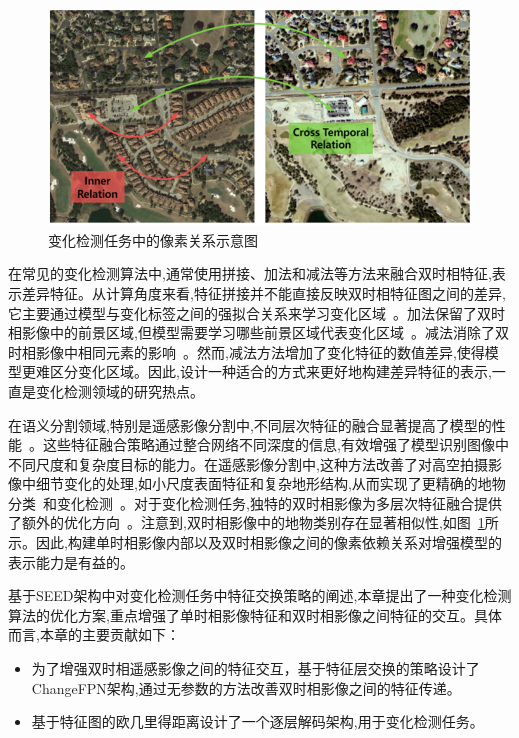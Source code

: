 \begin{figure}[!htbp]
  \centering
  \includegraphics[width=\textwidth]{paper_figures/基于双时相遥感影像特征交互的变化检测算法研究/EfficientCD/efficientcd_relation.png}
  \caption{变化检测任务中的像素关系示意图}
  \label{fig:efficientcd_relation}
\end{figure}

在常见的变化检测算法中,通常使用拼接、加法和减法等方法来融合双时相特征,表示差异特征。从计算角度来看,特征拼接并不能直接反映双时相特征图之间的差异,它主要通过模型与变化标签之间的强拟合关系来学习变化区域~\cite{Daudt2018FullyCS}。加法保留了双时相影像中的前景区域,但模型需要学习哪些前景区域代表变化区域~\cite{gu2023fdff}。减法消除了双时相影像中相同元素的影响~\cite{feng_change_2023}。然而,减法方法增加了变化特征的数值差异,使得模型更难区分变化区域。因此,设计一种适合的方式来更好地构建差异特征的表示,一直是变化检测领域的研究热点。

在语义分割领域,特别是遥感影像分割中,不同层次特征的融合显著提高了模型的性能~\cite{Dong2021AMF, lin_feature_2017}。这些特征融合策略通过整合网络不同深度的信息,有效增强了模型识别图像中不同尺度和复杂度目标的能力。在遥感影像分割中,这种方法改善了对高空拍摄影像中细节变化的处理,如小尺度表面特征和复杂地形结构,从而实现了更精确的地物分类~\cite{wang2022unetformer}和变化检测~\cite{dong_changeclip_2024}。对于变化检测任务,独特的双时相影像为多层次特征融合提供了额外的优化方向~\cite{dong_changeclip_2024, Li2023MDFENetAM}。注意到,双时相影像中的地物类别存在显著相似性,如图~\ref{fig:efficientcd_relation}所示。因此,构建单时相影像内部以及双时相影像之间的像素依赖关系对增强模型的表示能力是有益的。

基于SEED架构中对变化检测任务中特征交换策略的阐述,本章提出了一种变化检测算法的优化方案,重点增强了单时相影像特征和双时相影像之间特征的交互。具体而言,本章的主要贡献如下：
\begin{itemize}
  \item 为了增强双时相遥感影像之间的特征交互，基于特征层交换的策略设计了ChangeFPN架构,通过无参数的方法改善双时相影像之间的特征传递。
  \item 基于特征图的欧几里得距离设计了一个逐层解码架构,用于变化检测任务。
\end{itemize}

